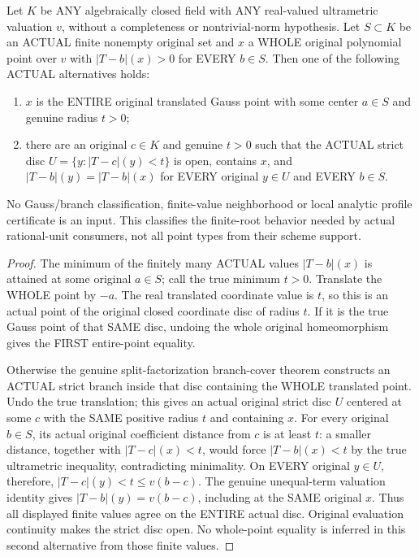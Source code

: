 \begin{theorem}
\label{analytic:actual-finite-root-neighborhood-dichotomy}
Let $K$ be ANY algebraically closed field with ANY real-valued ultrametric
valuation $v$, without a completeness or nontrivial-norm hypothesis. Let
$S\subset K$ be an ACTUAL finite nonempty original set and $x$ a WHOLE
original polynomial point over $v$ with $|T-b|(x)>0$ for EVERY $b\in S$.
Then one of the following ACTUAL alternatives holds:
\begin{enumerate}
\item $x$ is the ENTIRE original translated Gauss point with some center
$a\in S$ and genuine radius $t>0$;
\item there are an original $c\in K$ and genuine $t>0$ such that the ACTUAL
strict disc $U=\{y:|T-c|(y)<t\}$ is open, contains $x$, and
$|T-b|(y)=|T-b|(x)$ for EVERY original $y\in U$ and EVERY $b\in S$.
\end{enumerate}
No Gauss/branch classification, finite-value neighborhood or local analytic
profile certificate is an input. This classifies the finite-root behavior
needed by actual rational-unit consumers, not all point types from their
scheme support.
\leanok
\end{theorem}
\begin{proof}
The minimum of the finitely many ACTUAL values $|T-b|(x)$ is attained at
some original $a\in S$; call the true minimum $t>0$. Translate the WHOLE
point by $-a$. The real translated coordinate value is $t$, so this
is an actual point of the original closed coordinate disc of radius $t$.
If it is the true Gauss point of that SAME disc, undoing the whole original
homeomorphism gives the FIRST entire-point equality.

Otherwise the genuine split-factorization branch-cover theorem constructs
an ACTUAL strict branch inside that disc containing the WHOLE translated
point. Undo the true translation; this gives an actual original strict
disc $U$ centered at some $c$ with the SAME positive radius $t$ and containing
$x$. For every original $b\in S$, its actual original coefficient distance
from $c$ is at least $t$: a smaller distance, together with $|T-c|(x)<t$,
would force $|T-b|(x)<t$ by the true ultrametric inequality, contradicting
minimality. On EVERY original $y\in U$, therefore,
$|T-c|(y)<t\leq v(b-c)$. The genuine unequal-term valuation identity gives
$|T-b|(y)=v(b-c)$, including at the SAME original $x$.
Thus all displayed finite values agree on the ENTIRE actual disc.
Original evaluation continuity makes the strict disc open. No whole-point
equality is inferred in this second alternative from those finite values.
\end{proof}
